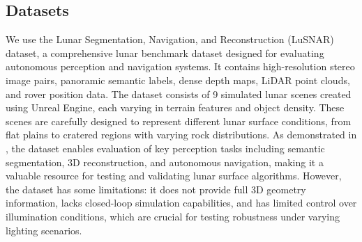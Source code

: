 \subsection{Datasets}

We use the Lunar Segmentation, Navigation, and Reconstruction (LuSNAR) dataset, a comprehensive lunar benchmark dataset designed for evaluating autonomous perception and navigation systems. It contains high-resolution stereo image pairs, panoramic semantic labels, dense depth maps, LiDAR point clouds, and rover position data. The dataset consists of 9 simulated lunar scenes created using Unreal Engine, each varying in terrain features and object density. These scenes are carefully designed to represent different lunar surface conditions, from flat plains to cratered regions with varying rock distributions. As demonstrated in \cite{liu_lusnarlunar_2024}, the dataset enables evaluation of key perception tasks including semantic segmentation, 3D reconstruction, and autonomous navigation, making it a valuable resource for testing and validating lunar surface algorithms. However, the dataset has some limitations: it does not provide full 3D geometry information, lacks closed-loop simulation capabilities, and has limited control over illumination conditions, which are crucial for testing robustness under varying lighting scenarios.

